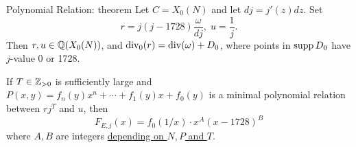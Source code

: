 \documentclass[handout]{beamer}
\begin{document}



\begin{frame}{Polynomial Relation: theorem}
Let $C = X_0(N)$ and let $dj = j'(z)dz$. Set
\[
r = j(j-1728)  \frac{\omega }{{dj}}, \;  u = \frac{1}{j}.
\]
Then $r, u \in \mathbb{Q}(X_0(N))$, and $\operatorname{div}_0(r)  = \operatorname{div}(\omega) + D_0$, where points in $\operatorname{supp} D_0$ have $j$-value 0 or 1728.  \\

\smallskip 

\pause


\begin{theorem}[C.]
If $T \in \mathbb{Z}_{>0}$ is sufficiently large and $P(x,y) = f_n(y)x^n + \cdots + f_1(y)x + f_0(y)$ is a minimal polynomial relation between $rj^T$ and $u$, then
\[
		F_{E,j}(x) = f_0 ( 1/x) \cdot x^{A} (x - 1728)^B
\]	
where $A,B$ are integers  \hyperlink{consts AB}{depending on $N, P$ and $T$}.


\end{theorem}

\hypertarget{theorem}{}

\end{frame}
\end{document}
